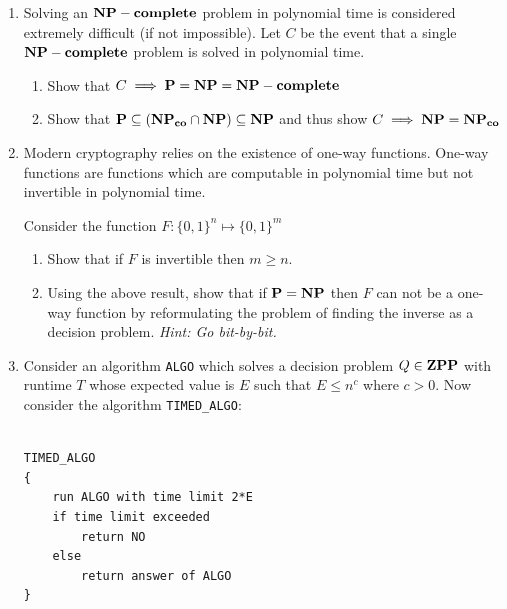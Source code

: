 \begin{enumerate}

\item[\textbf{1}]
Solving an $\mathbf{NP-complete}$ problem in polynomial time is considered extremely difficult (if not impossible).
Let $C$ be the event that a single $\mathbf{NP-complete}$ problem is solved in polynomial time.

\begin{enumerate}[label=\textbf{(\alph*)}]
\item Show that $C \implies \mathbf{P} = \mathbf{NP} = \mathbf{NP-complete}$
\item Show that $\mathbf{P} \subseteq \left(\mathbf{NP_{co}} \cap \mathbf{NP}\right) \subseteq \mathbf{NP}$ and thus show $C \implies \mathbf{NP} = \mathbf{NP_{co}}$
\end{enumerate}

\item[\textbf{2}]
Modern cryptography relies on the existence of one-way functions. One-way functions are functions which 
are computable in polynomial time but not invertible in polynomial time. 

Consider the function $F: \{0,1\}^n \mapsto \{0,1\}^m$

\begin{enumerate}[label=\textbf{(\alph*)}]
\item Show that if $F$ is invertible then $m \ge n$.
\item Using the above result, show that if $\mathbf{P}=\mathbf{NP}$ then $F$ can not be a one-way function by 
reformulating the problem of finding the inverse as a decision problem.
\emph{Hint: Go bit-by-bit.}
\end{enumerate}

\item[\textbf{3}]
\noindent Consider an algorithm \texttt{ALGO} which solves a decision problem $Q \in \mathbf{ZPP}$ with 
runtime $T$ whose expected value is $E$ such that $E \le n^c$ where $c>0$. 
Now consider the algorithm \texttt{TIMED\_ALGO}:

\begin{center}
\begin{minipage}{0.9\linewidth}
\begin{framed}
\begin{Verbatim}

TIMED_ALGO
{
    run ALGO with time limit 2*E
    if time limit exceeded
        return NO
    else 
        return answer of ALGO
}
\end{Verbatim}
\vspace{-4mm}
\end{framed}
\end{minipage}
\end{center}


\end{enumerate}
